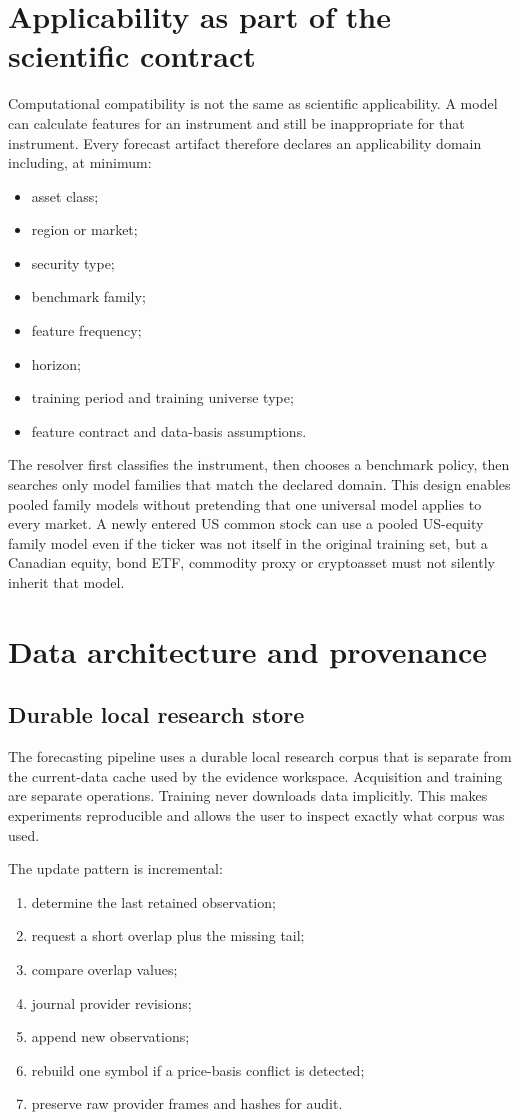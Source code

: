 \documentclass[11pt]{article}
\begin{document}
\section{Applicability as part of the scientific contract}
Computational compatibility is not the same as scientific applicability. A model can calculate features for an instrument and still be inappropriate for that instrument. Every forecast artifact therefore declares an applicability domain including, at minimum:
\begin{itemize}[itemsep=0.2em]
\item asset class;
\item region or market;
\item security type;
\item benchmark family;
\item feature frequency;
\item horizon;
\item training period and training universe type;
\item feature contract and data-basis assumptions.
\end{itemize}

The resolver first classifies the instrument, then chooses a benchmark policy, then searches only model families that match the declared domain. This design enables pooled family models without pretending that one universal model applies to every market. A newly entered US common stock can use a pooled US-equity family model even if the ticker was not itself in the original training set, but a Canadian equity, bond ETF, commodity proxy or cryptoasset must not silently inherit that model.

\section{Data architecture and provenance}
\subsection{Durable local research store}
The forecasting pipeline uses a durable local research corpus that is separate from the current-data cache used by the evidence workspace. Acquisition and training are separate operations. Training never downloads data implicitly. This makes experiments reproducible and allows the user to inspect exactly what corpus was used.

The update pattern is incremental:
\begin{enumerate}[itemsep=0.2em]
\item determine the last retained observation;
\item request a short overlap plus the missing tail;
\item compare overlap values;
\item journal provider revisions;
\item append new observations;
\item rebuild one symbol if a price-basis conflict is detected;
\item preserve raw provider frames and hashes for audit.
\end{enumerate}
\end{document}
